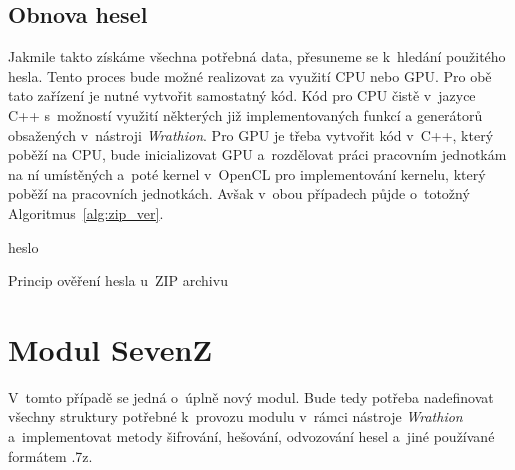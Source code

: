 \subsection{Obnova hesel}
Jakmile takto získáme všechna potřebná data, přesuneme se k~hledání použitého hesla. Tento proces
bude možné realizovat za využití CPU nebo GPU. Pro obě tato zařízení je nutné vytvořit samostatný
kód. Kód pro CPU čistě v~jazyce C++ s~možností využití některých již implementovaných funkcí a
generátorů obsažených v~nástroji {\it Wrathion}. Pro GPU je třeba vytvořit kód v~C++, který
poběží na CPU, bude inicializovat GPU a~rozdělovat práci pracovním jednotkám na ní umístěných
a~poté kernel v~OpenCL pro implementování kernelu, který poběží na pracovních jednotkách. Avšak
v~obou případech půjde o~totožný Algoritmus~\ref{alg:zip_ver}.

\begin{algorithm}[ht]
    \SetStartEndCondition{ (}{)}{)}\SetAlgoBlockMarkers{}{}%
    \AlgoDisplayBlockMarkers\SetAlgoNoLine%
    \DontPrintSemicolon
    \Return heslo\;
    \caption{Princip ověření hesla u~ZIP archivu}\label{alg:zip_ver}
\end{algorithm}

\section{Modul SevenZ}
V~tomto případě se jedná o~úplně nový modul. Bude tedy potřeba nadefinovat všechny struktury
potřebné k~provozu modulu v~rámci nástroje {\it Wrathion} a~implementovat metody šifrování,
hešování, odvozování hesel a~jiné používané formátem .7z.


